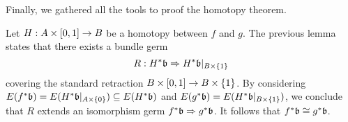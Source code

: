 \begin{scope}
\begin{myparagraph}
    Finally, we gathered all the tools to proof the homotopy theorem.
\end{myparagraph}

\begin{myproof}
Let $H: A \times [0, 1] \to B$ be a homotopy between $f$ and $g$.
The previous lemma states that there exists a bundle germ
\[ R: H^*\mathfrak{b} \Rightarrow{}{} H^*\mathfrak{b}\vert_{B \times \{1\}} \]
covering the standard retraction $B \times [0, 1] \to B \times \{1\}$.
By considering $E(f^*\mathfrak{b}) = E(H^*\mathfrak{b}\vert_{A \times \{0\}}) \subseteq{} E(H^*\mathfrak{b})$ and $E(g^*\mathfrak{b}) = E(H^*\mathfrak{b}\vert_{B \times \{1\}})$,
we conclude that $R$ extends an isomorphism germ $f^*\mathfrak{b} \Rightarrow{}{} g^*\mathfrak{b}$.
It follows that $f^*\mathfrak{b} \cong g^*\mathfrak{b}$.
\end{myproof}

\end{scope}